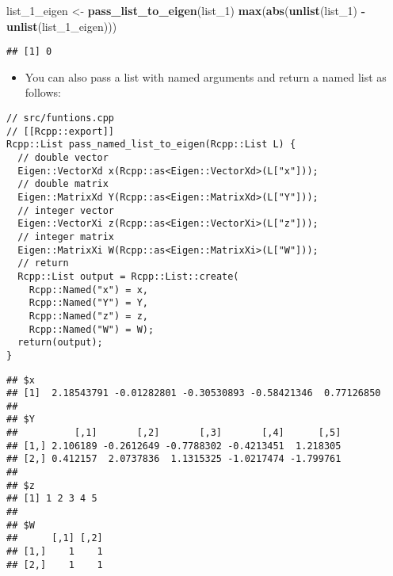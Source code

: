 \documentclass[
]{book}
\newenvironment{Shaded}{\begin{snugshade}}{\end{snugshade}}
\newcommand{\CommentTok}[1]{\textcolor[rgb]{0.56,0.35,0.01}{\textit{#1}}}
\newcommand{\DecValTok}[1]{\textcolor[rgb]{0.00,0.00,0.81}{#1}}
\newcommand{\KeywordTok}[1]{\textcolor[rgb]{0.13,0.29,0.53}{\textbf{#1}}}
\newcommand{\NormalTok}[1]{#1}
\newcommand{\OperatorTok}[1]{\textcolor[rgb]{0.81,0.36,0.00}{\textbf{#1}}}
\newcommand{\StringTok}[1]{\textcolor[rgb]{0.31,0.60,0.02}{#1}}
\providecommand{\tightlist}{%
  \setlength{\itemsep}{0pt}\setlength{\parskip}{0pt}}
\begin{document}
\begin{Shaded}
\begin{Highlighting}[]
\NormalTok{list_}\DecValTok{1}\NormalTok{_eigen <-}\StringTok{ }\KeywordTok{pass_list_to_eigen}\NormalTok{(list_}\DecValTok{1}\NormalTok{)}
\KeywordTok{max}\NormalTok{(}\KeywordTok{abs}\NormalTok{(}\KeywordTok{unlist}\NormalTok{(list_}\DecValTok{1}\NormalTok{) }\OperatorTok{-}\StringTok{ }\KeywordTok{unlist}\NormalTok{(list_}\DecValTok{1}\NormalTok{_eigen)))}
\end{Highlighting}
\end{Shaded}

\begin{verbatim}
## [1] 0
\end{verbatim}

\begin{itemize}
\tightlist
\item
  You can also pass a list with named arguments and return a named list as follows:
\end{itemize}

\begin{verbatim}
// src/funtions.cpp
// [[Rcpp::export]]
Rcpp::List pass_named_list_to_eigen(Rcpp::List L) {
  // double vector
  Eigen::VectorXd x(Rcpp::as<Eigen::VectorXd>(L["x"]));
  // double matrix
  Eigen::MatrixXd Y(Rcpp::as<Eigen::MatrixXd>(L["Y"]));
  // integer vector
  Eigen::VectorXi z(Rcpp::as<Eigen::VectorXi>(L["z"]));
  // integer matrix
  Eigen::MatrixXi W(Rcpp::as<Eigen::MatrixXi>(L["W"]));
  // return
  Rcpp::List output = Rcpp::List::create(
    Rcpp::Named("x") = x, 
    Rcpp::Named("Y") = Y, 
    Rcpp::Named("z") = z, 
    Rcpp::Named("W") = W);
  return(output);
}
\end{verbatim}

\begin{Shaded}
\end{Shaded}

\begin{verbatim}
## $x
## [1]  2.18543791 -0.01282801 -0.30530893 -0.58421346  0.77126850
## 
## $Y
##          [,1]       [,2]       [,3]       [,4]      [,5]
## [1,] 2.106189 -0.2612649 -0.7788302 -0.4213451  1.218305
## [2,] 0.412157  2.0737836  1.1315325 -1.0217474 -1.799761
## 
## $z
## [1] 1 2 3 4 5
## 
## $W
##      [,1] [,2]
## [1,]    1    1
## [2,]    1    1
\end{verbatim}
\end{document}
